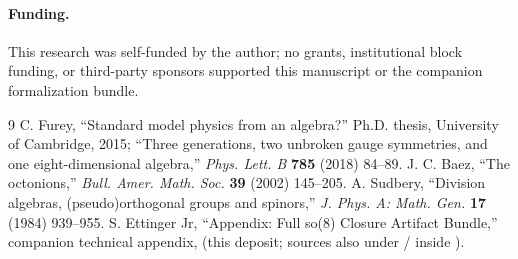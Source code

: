 \documentclass[11pt]{amsart}
\begin{document}
\paragraph{Funding.}
This research was self-funded by the author; no grants, institutional block funding, or third-party sponsors supported this manuscript or the companion formalization bundle.

\begin{thebibliography}{9}
C. Furey, ``Standard model physics from an algebra?'' Ph.D. thesis, University of Cambridge, 2015; ``Three generations, two unbroken gauge symmetries, and one eight-dimensional algebra,'' \textit{Phys. Lett. B} \textbf{785} (2018) 84--89.
J. C. Baez, ``The octonions,'' \textit{Bull. Amer. Math. Soc.} \textbf{39} (2002) 145--205.
A. Sudbery, ``Division algebras, (pseudo)orthogonal groups and spinors,'' \textit{J. Phys. A: Math. Gen.} \textbf{17} (1984) 939--955.
S. Ettinger Jr, ``Appendix: Full so(8) Closure Artifact Bundle,'' companion technical appendix,  (this deposit; sources also under \PaperReproBundleDir/ inside \CompanionCodeZip{}).
\end{thebibliography}
\end{document}
